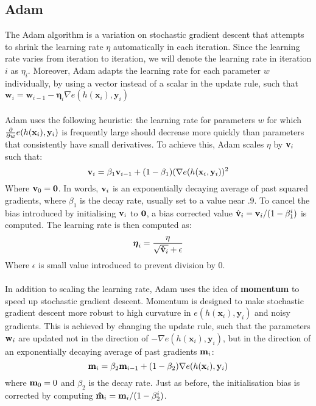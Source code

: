 \subsection{Adam}
\label{adam}
The Adam algorithm is a variation on stochastic gradient descent that attempts to shrink the learning rate $\eta$ automatically in each iteration. Since the learning rate varies from iteration to iteration, we will denote the learning rate in iteration $i$ as $\eta_i$. Moreover, Adam adapts the learning rate for each parameter $w$ individually, by using a vector instead of a scalar in the update rule, such that $\mathbf{w}_i = \mathbf{w}_{i-1} - \boldsymbol{\eta}_i\nabla e(h(\mathbf{x}_i), \mathbf{y}_i)$
\\\\
Adam uses the following heuristic: the learning rate for parameters $w$ for which $\frac{\partial }{\partial w} e(h(\mathbf{x}_i), \mathbf{y}_i)$ is frequently large should decrease more quickly than parameters that consistently have small derivatives. To achieve this, Adam scales $\eta$ by $\mathbf{v}_i$ such that:
$$ 
\mathbf{v}_i = \beta_1 \mathbf{v}_{i - 1} + (1 - \beta_1)(\nabla e(h(\mathbf{x}_i, \mathbf{y}_i))^2
$$
Where $\mathbf{v}_0 = \mathbf{0}$. In words, $\mathbf{v}_i$ is an exponentially decaying average of past squared gradients, where $\beta_1$ is the decay rate, usually set to a value near $.9$. To cancel the bias introduced by initialising $\mathbf{v}_i$ to $\mathbf{0}$, a bias corrected value $\hat{\mathbf{v}}_i = \mathbf{v}_i / (1 - \beta_1^i)$ is computed. The learning rate is then computed as:
$$
\boldsymbol{\eta}_i = \frac{\eta}{\sqrt{{\mathbf{\hat{v}}_i}} + \epsilon}
$$
Where $\epsilon$ is small value introduced to prevent division by 0.
\\\\
In addition to scaling the learning rate, Adam uses the idea of \textbf{momentum} to speed up stochastic gradient descent. Momentum is designed to make stochastic gradient descent more robust to high curvature in $e(h(\mathbf{x}_i), \mathbf{y}_i)$ and noisy gradients. This is achieved by changing the update rule, such that the parameters $\mathbf{w}_i$ are updated not in the direction of $-\nabla e(h(\mathbf{x}_i), \mathbf{y}_i)$, but in the direction of an exponentially decaying average of past gradients $\mathbf{m}_i$:
$$
\mathbf{m}_i = \beta_2 \mathbf{m}_{i - 1} + (1 - \beta_2)\nabla e(h(\mathbf{x}_i), \mathbf{y}_i)
$$
where $\mathbf{m}_0 = 0$ and $\beta_2$ is the decay rate. Just as before, the initialisation bias is corrected by computing $\mathbf{\hat{m}}_i = \mathbf{m}_i / (1 - \beta_2^i)$.

